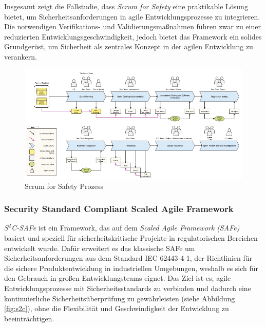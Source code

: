 \documentclass[acmtog]{acmart}
\begin{document}
Insgesamt zeigt die Fallstudie, dass \textit{Scrum for Safety} eine praktikable Lösung bietet, um Sicherheitsanforderungen in agile Entwicklungsprozesse zu integrieren.
Die notwendigen Verifikations- und Validierungsmaßnahmen führen zwar zu einer reduzierten Entwicklungsgeschwindigkeit, jedoch bietet das Framework ein solides Grundgerüst, um Sicherheit als zentrales
Konzept in der agilen Entwicklung zu verankern. \cite{barbareschi_scrum_2022}

\begin{figure}
  \centering
  \includegraphics[width=0.9\linewidth]{images/S4S-Safe-Sprint.png}
  \caption{Scrum for Safety Prozess}
  \label{fig:scrum4safety}
\end{figure}

\subsubsection{Security Standard Compliant Scaled Agile Framework}

\textit{$S^2$C-SAFe} ist ein Framework, das auf dem \textit{Scaled Agile Framework (SAFe)} basiert und speziell für sicherheitskritische Projekte in regulatorischen Bereichen entwickelt wurde. 
Dafür erweitert es das klassische SAFe um Sicherheitsanforderungen aus dem Standard IEC 62443-4-1, der Richtlinien für die sichere Produktentwicklung
in industriellen Umgebungen, weshalb es sich für den Gebrauch in großen Entwicklungsteams eignet. \cite{moyon_how_2020} Das Ziel ist es, agile Entwicklungsprozesse mit Sicherheitsstandards zu verbinden und dadurch eine kontinuierliche Sicherheitsüberprüfung zu gewährleisten (siehe Abbildung \ref{fig:s2c}), ohne 
die Flexibilität und Geschwindigkeit der Entwicklung zu beeinträchtigen. \cite{moyon_how_2020}
\end{document}
